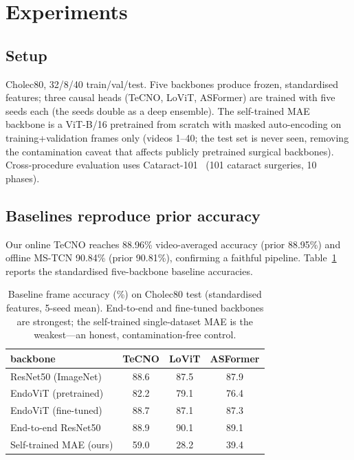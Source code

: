 \documentclass[11pt]{article}
\begin{document}
\section{Experiments}
\subsection{Setup}
\label{sec:setup}
Cholec80, 32/8/40 train/val/test. Five backbones produce frozen, standardised
features; three causal heads (TeCNO, LoViT, ASFormer) are trained with five seeds
each (the seeds double as a deep ensemble). The self-trained MAE backbone is a
ViT-B/16 pretrained from scratch with masked auto-encoding on training+validation
frames only (videos 1--40; the test set is never seen, removing the contamination
caveat that affects publicly pretrained surgical backbones). Cross-procedure
evaluation uses Cataract-101~\cite{cataract101} (101 cataract surgeries, 10 phases).

\subsection{Baselines reproduce prior accuracy}
Our online TeCNO reaches 88.96\% video-averaged accuracy (prior 88.95\%) and offline
MS-TCN 90.84\% (prior 90.81\%), confirming a faithful pipeline. Table~\ref{tab:bb}
reports the standardised five-backbone baseline accuracies.

\begin{table}[t]\centering\small
\caption{Baseline frame accuracy (\%) on Cholec80 test (standardised features,
5-seed mean). End-to-end and fine-tuned backbones are strongest; the self-trained
single-dataset MAE is the weakest---an honest, contamination-free control.}
\label{tab:bb}
\begin{tabular}{lccc}
\toprule
backbone & TeCNO & LoViT & ASFormer \\
\midrule
ResNet50 (ImageNet)        & 88.6 & 87.5 & 87.9 \\
EndoViT (pretrained)       & 82.2 & 79.1 & 76.4 \\
EndoViT (fine-tuned)       & 88.7 & 87.1 & 87.3 \\
End-to-end ResNet50        & 88.9 & 90.1 & 89.1 \\
Self-trained MAE (ours)    & 59.0 & 28.2 & 39.4 \\
\bottomrule
\end{tabular}
\end{table}
\end{document}
